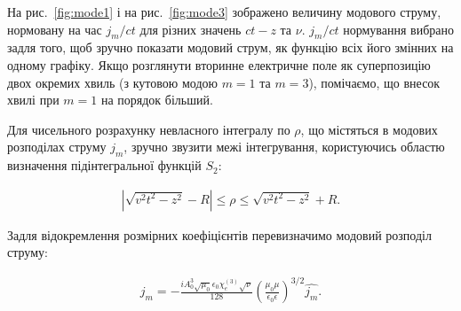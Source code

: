 На рис.~\ref{fig:mode1} і на рис.~\ref{fig:mode3} зображено величину модового 
струму, нормовану на час $ j_m / ct $ для різних значень $ ct-z $ та $ \nu $.
$ j_m / ct $ нормування вибрано задля того, щоб зручно показати модовий 
струм, як функцію всіх його змінних на одному графіку. Якщо розглянути вторинне
електричне поле як суперпозицію двох окремих хвиль (з кутовою модою $ m = 1 $ 
та $ m = 3 $), помічаємо, що внесок хвилі при $ m = 1 $ на порядок більший.

Для чисельного розрахунку невласного інтегралу по $ \rho $, що містяться в 
модових розподілах струму $ j_m $, зручно звузити межі інтегрування, 
користуючись областю визначення підінтегральної функцій $ S_2 $:

%
%
%
%
\begin{equation} \begin{aligned}
\left| \sqrt{v^2t^2 - z^2} - R \right| \leq \rho \leq \sqrt{v^2t^2 - z^2} + R.
\end{aligned} \end{equation}

Задля відокремлення розмірних коефіцієнтів перевизначимо модовий розподіл 
струму:

\begin{equation} \begin{aligned}
j_m = - \frac{i A_0^3 \sqrt{\mu_0} \epsilon_0 \chi_e^{(3)} \sqrt{\nu}}{128}
\left( \frac{\mu_0 \mu}{\epsilon_0 \epsilon} \right)^{3/2} \hat{j_m}.
\end{aligned} \end{equation}

